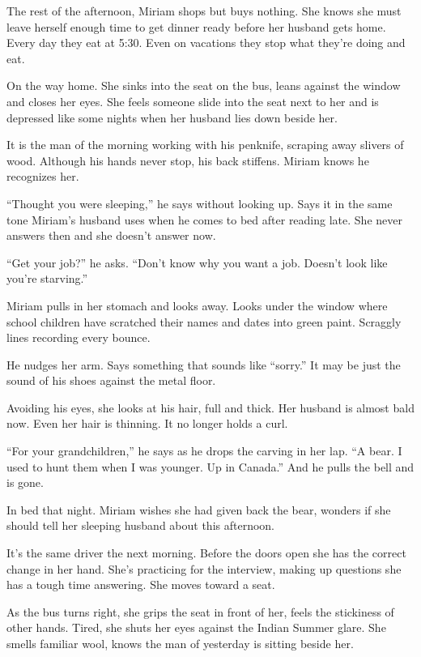 \documentclass[
]{article}
\begin{document}
The rest of the afternoon, Miriam shops but buys nothing. She knows she
must leave herself enough time to get dinner ready before her husband
gets home. Every day they eat at 5:30. Even on vacations they stop what
they're doing and eat.

On the way home. She sinks into the seat on the bus, leans against the
window and closes her eyes. She feels someone slide into the seat next
to her and is depressed like some nights when her husband lies down
beside her.

It is the man of the morning working with his penknife, scraping away
slivers of wood. Although his hands never stop, his back stiffens.
Miriam knows he recognizes her.

``Thought you were sleeping,'' he says without looking up. Says it in
the same tone Miriam's husband uses when he comes to bed after reading
late. She never answers then and she doesn't answer now.

``Get your job?'' he asks. ``Don't know why you want a job. Doesn't look
like you're starving.''

Miriam pulls in her stomach and looks away. Looks under the window where
school children have scratched their names and dates into green paint.
Scraggly lines recording every bounce.

He nudges her arm. Says something that sounds like ``sorry.'' It may be
just the sound of his shoes against the metal floor.

Avoiding his eyes, she looks at his hair, full and thick. Her husband is
almost bald now. Even her hair is thinning. It no longer holds a curl.

``For your grandchildren,'' he says as he drops the carving in her lap.
``A bear. I used to hunt them when I was younger. Up in Canada.'' And he
pulls the bell and is gone.

In bed that night. Miriam wishes she had given back the bear, wonders if
she should tell her sleeping husband about this afternoon.

It's the same driver the next morning. Before the doors open she has the
correct change in her hand. She's practicing for the interview, making
up questions she has a tough time answering. She moves toward a seat.

As the bus turns right, she grips the seat in front of her, feels the
stickiness of other hands. Tired, she shuts her eyes against the Indian
Summer glare. She smells familiar wool, knows the man of yesterday is
sitting beside her.
\end{document}
